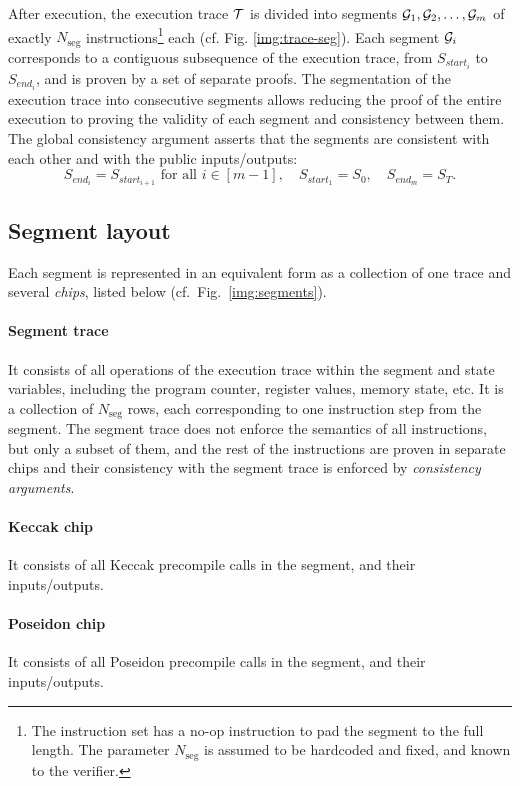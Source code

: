 After execution, the execution trace $\mathcal{T}$ is divided into segments $\mathcal{G}_1,\mathcal{G}_2,\ldots,\mathcal{G}_m$
of exactly $N_{\text{seg}}$ instructions\footnote{The instruction
set has a no-op instruction to pad the segment to the full length.
The parameter $N_{\text{seg}}$ is assumed to be hardcoded and fixed, and known to the verifier.} each (cf. Fig. \ref{img:trace-seg}). Each segment $\mathcal{G}_i$ corresponds to a contiguous
subsequence of the execution trace, from $S_{start_i}$ to $S_{end_i}$, and is proven by a set of separate
proofs.
The segmentation of the execution trace into consecutive segments
allows reducing the proof of the entire execution to proving the validity of each segment
and consistency between them. The global consistency argument asserts that the segments are consistent with each other
and with the public inputs/outputs:
$$
S_{end_i} = S_{start_{i+1}}\text{ for all }i\in[m-1],\quad S_{start_1}=S_0,\quad S_{end_m}=S_T.
$$

\subsection{Segment layout}

Each segment is represented in an equivalent form as a collection of one trace and several
\emph{chips}, listed below (cf.\ Fig.~\ref{img:segments}).


\paragraph{Segment trace}
It consists of all  operations of the execution trace within
the segment and state variables, including the program counter, register values, memory state, etc.
It is a collection of $N_{\text{seg}}$ rows, each corresponding to one instruction step
from the segment. The segment trace does not enforce the semantics of all instructions,
but only a subset of them, and the rest of the instructions are proven
in separate chips  and their consistency with the segment trace is enforced by
\emph{consistency arguments}.

\paragraph{Keccak chip}  It consists of all Keccak precompile calls in the segment, and their inputs/outputs.

\paragraph{Poseidon chip}
It consists of all Poseidon precompile calls in the segment, and their inputs/outputs.

